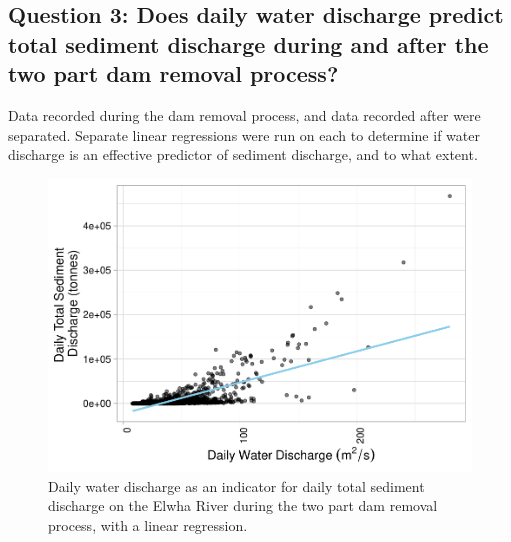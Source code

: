 \documentclass[12pt,]{article}
\begin{document}
\newpage

\hypertarget{question-3-does-daily-water-discharge-predict-total-sediment-discharge-during-and-after-the-two-part-dam-removal-process}{%
\subsection{Question 3: Does daily water discharge predict total
sediment discharge during and after the two part dam removal
process?}\label{question-3-does-daily-water-discharge-predict-total-sediment-discharge-during-and-after-the-two-part-dam-removal-process}}

Data recorded during the dam removal process, and data recorded after
were separated. Separate linear regressions were run on each to
determine if water discharge is an effective predictor of sediment
discharge, and to what extent.

\begin{figure}
\centering
\includegraphics{Mason_ENV872_ProjectFinal_files/figure-latex/Linear During (Figure 13)-1.pdf}
\caption{Daily water discharge as an indicator for daily total sediment
discharge on the Elwha River during the two part dam removal process,
with a linear regression.}
\end{figure}
\end{document}
